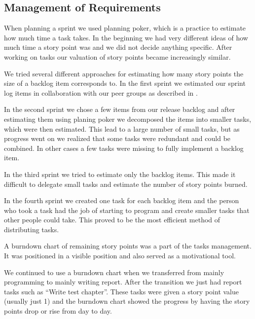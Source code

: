 \subsection{Management of Requirements}
When planning a sprint we used planning poker, which is a \scrum{} practice to estimate how much time a task takes. 
In the beginning we had very different ideas of how much time a story point was and we did not decide anything specific. 
After working on tasks our valuation of story points became increasingly similar.

We tried several different approaches for estimating how many story points the size of a backlog item corresponds to. 
In the first sprint we estimated our sprint log items in collaboration with our peer groups as described in .

In the second sprint we chose a few items from our release backlog and after estimating them using planing poker we decomposed the items into smaller tasks, which were then estimated. 
This lead to a large number of small tasks, but as progress went on we realized that some tasks were redundant and could be combined. 
In other cases a few tasks were missing to fully implement a backlog item.

In the third sprint we tried to estimate only the backlog items.
This made it difficult to delegate small tasks and estimate the number of story points burned.

In the fourth sprint we created one task for each backlog item and the person who took a task had the job of starting to program and create smaller tasks that other people could take. 
This proved to be the most efficient method of distributing tasks.

A burndown chart of remaining story points was a part of the tasks management.
It was positioned in a visible position and also served as a motivational tool.

We continued to use a burndown chart when we transferred from mainly programming to mainly writing report.
After the transition we just had report tasks such as ``Write test chapter''.
These tasks were given a story point value (usually just 1) and the burndown chart showed the progress by having the story points drop or rise from day to day.

